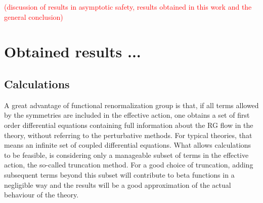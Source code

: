 \documentclass[11pt, a4paper]{article}
\begin{document}



\textcolor{red}{(discussion of results in asymptotic safety, results obtained in this work and the general conclusion)} 

\section{Obtained results ...}

\subsection{Calculations}

A great advantage of functional renormalization group is that, if all terms
allowed by the symmetries are included in the effective action, one obtains a set of first order
differential equations containing full information about the RG flow in the theory, without referring to the perturbative methods.
For typical theories, that means an infinite set of coupled differential equations.
What allows calculations to be feasible, is considering only a manageable subset of terms in the effective action, the so-called truncation method.
For a good choice of truncation, adding subsequent terms beyond this subset will contribute to beta functions in a negligible way
and the results will be a good approximation of the actual behaviour of the theory.
\end{document}
